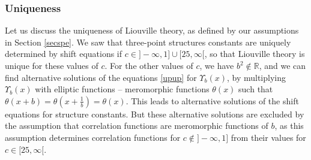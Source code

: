 \documentclass[12pt, a4paper, notitlepage, twoside]{report}
\numberwithin{equation}{section}
\theoremstyle{break}
\begin{document}
\subsubsection{Uniqueness}

Let us discuss the uniqueness of Liouville theory, as defined by our assumptions in Section \ref{secspe}. 
We saw that three-point structures constants are uniquely determined by shift equations if $c\in ]-\infty, 1] \cup [25,\infty[$, so that Liouville theory is unique for these values of $c$. 
For the other values of $c$, we have $b^2\notin\mathbb{R}$, and we can find alternative solutions of the equations \eqref{upup} for $\Upsilon_b(x)$, by multiplying $\Upsilon_b(x)$ with elliptic functions -- meromorphic functions $\theta(x)$ such that $\theta(x+b)=\theta(x+\frac{1}{b}) = \theta(x)$.
This leads to alternative solutions of the shift equations for structure constants.
But these alternative solutions are excluded by the assumption that correlation functions are meromorphic functions of $b$, as this assumption determines correlation functions for $c\notin ]-\infty, 1]$ from their values for $c\in [25,\infty[$.
\end{document}
